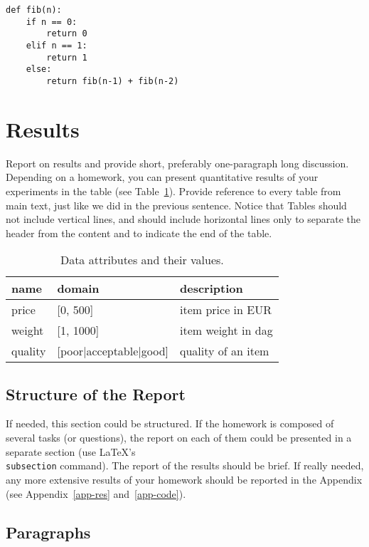 \documentclass[a4paper,11pt]{article}
\begin{document}
\begin{lstlisting}
def fib(n):
    if n == 0:
        return 0
    elif n == 1:
        return 1
    else:
        return fib(n-1) + fib(n-2)
\end{lstlisting}

\section{Results}

Report on results and provide short, preferably one-paragraph long discussion. Depending on a homework, you can present quantitative results of your experiments in the table (see Table~\ref{tab1}). Provide reference to every table from main text, just like we did in the previous sentence. Notice that Tables should not include vertical lines, and should include horizontal lines only to separate the header from the content and to indicate the end of the table.

\begin{table}[htbp]
\caption{Data attributes and their values.}
\label{tab1}
\begin{center}
\begin{tabular}{llp{4cm}}
\hline
name & domain  & description \\
\hline
price & [0, 500] & item price in EUR\\
weight & [1, 1000] & item weight in dag \\
quality & [poor|acceptable|good] & quality of an item \\
\hline
\end{tabular}
\end{center}
\end{table}

\subsection{Structure of the Report}

If needed, this section could be structured. If the homework is composed of several tasks (or questions), the report on each of them could be presented in a separate section (use \LaTeX's {\tt \\subsection} command). The report of the results should be brief. If really needed, any  more extensive results of your homework should be reported in the Appendix (see Appendix~\ref{app-res} and~\ref{app-code}).

\subsection{Paragraphs}
\end{document}
